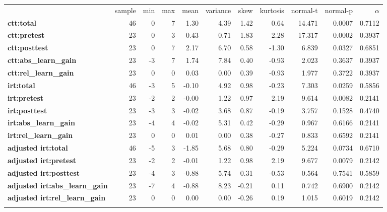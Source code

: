 \documentclass[]{article}
\begin{document}
\begin{longtable}[c]{@{}lrrrrrrrrrr@{}}
\toprule\addlinespace
& sample & min & max & mean & variance & skew & kurtosis & normal-t &
normal-p & $\alpha$
\\\addlinespace
\midrule\endhead
\textbf{ctt:total} & 46 & 0 & 7 & 1.30 & 4.39 & 1.42 & 0.64 & 14.471 &
0.0007 & 0.7112
\\\addlinespace
\textbf{ctt:pretest} & 23 & 0 & 3 & 0.43 & 0.71 & 1.83 & 2.28 & 17.317 &
0.0002 & 0.3937
\\\addlinespace
\textbf{ctt:posttest} & 23 & 0 & 7 & 2.17 & 6.70 & 0.58 & -1.30 & 6.839
& 0.0327 & 0.6851
\\\addlinespace
\textbf{ctt:abs\_learn\_gain} & 23 & -3 & 7 & 1.74 & 7.84 & 0.40 & -0.93
& 2.023 & 0.3637 & 0.3937
\\\addlinespace
\textbf{ctt:rel\_learn\_gain} & 23 & 0 & 0 & 0.03 & 0.00 & 0.39 & -0.93
& 1.977 & 0.3722 & 0.3937
\\\addlinespace
\textbf{irt:total} & 46 & -3 & 5 & -0.10 & 4.92 & 0.98 & -0.23 & 7.303 &
0.0259 & 0.5856
\\\addlinespace
\textbf{irt:pretest} & 23 & -2 & 2 & -0.00 & 1.22 & 0.97 & 2.19 & 9.614
& 0.0082 & 0.2141
\\\addlinespace
\textbf{irt:posttest} & 23 & -3 & 3 & -0.02 & 3.68 & 0.87 & -0.19 &
3.757 & 0.1528 & 0.4740
\\\addlinespace
\textbf{irt:abs\_learn\_gain} & 23 & -4 & 4 & -0.02 & 5.31 & 0.42 &
-0.29 & 0.967 & 0.6166 & 0.2141
\\\addlinespace
\textbf{irt:rel\_learn\_gain} & 23 & 0 & 0 & 0.01 & 0.00 & 0.38 & -0.27
& 0.833 & 0.6592 & 0.2141
\\\addlinespace
\textbf{adjusted irt:total} & 46 & -5 & 3 & -1.85 & 5.68 & 0.80 & -0.29
& 5.224 & 0.0734 & 0.6710
\\\addlinespace
\textbf{adjusted irt:pretest} & 23 & -2 & 2 & -0.01 & 1.22 & 0.98 & 2.19
& 9.677 & 0.0079 & 0.2142
\\\addlinespace
\textbf{adjusted irt:posttest} & 23 & -4 & 3 & -0.88 & 5.74 & 0.31 &
-0.53 & 0.564 & 0.7541 & 0.5859
\\\addlinespace
\textbf{adjusted irt:abs\_learn\_gain} & 23 & -7 & 4 & -0.88 & 8.23 &
-0.21 & 0.11 & 0.742 & 0.6900 & 0.2142
\\\addlinespace
\textbf{adjusted irt:rel\_learn\_gain} & 23 & 0 & 0 & 0.00 & 0.00 &
-0.26 & 0.19 & 1.015 & 0.6019 & 0.2142
\\\addlinespace
\bottomrule
\end{longtable}
\end{document}
